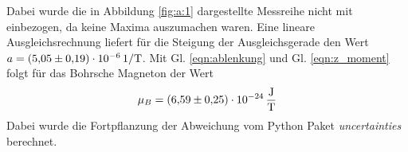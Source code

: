 Dabei wurde die in Abbildung \ref{fig:a:1} dargestellte Messreihe nicht mit einbezogen, da keine Maxima auszumachen waren.
Eine lineare Ausgleichsrechnung liefert für die Steigung der Ausgleichsgerade den Wert $a=\SI{5.05\pm 0.19e-06}{1\per\tesla}$.
Mit Gl. \eqref{eqn:ablenkung} und Gl. \eqref{eqn:z_moment} folgt für das Bohrsche Magneton der Wert
\begin{align*}
\mu_B = \SI{6.59 \pm 0.25 e-24}{\joule\per\tesla}
\end{align*}
Dabei wurde die Fortpflanzung der Abweichung vom Python Paket \textit{uncertainties} berechnet.
